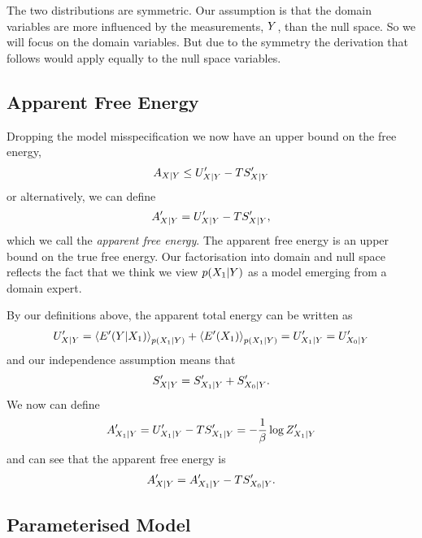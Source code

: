 \documentclass[]{article}
\begin{document}
The two distributions are symmetric. Our assumption is that the domain
variables are more influenced by the measurements, \(Y\),
than the null space. So we will focus on the domain variables. But due
to the symmetry the derivation that follows would apply equally to the
null space variables.

\subsection{Apparent Free Energy}

Dropping the model misspecification we now have an upper bound on the
free energy, 
\[
A_{X|Y} \leq U^\prime_{X|Y} - TS^\prime_{X|Y} 
\] 
or alternatively, we can define 
\[
A^\prime_{X|Y} = U^\prime_{X|Y} - TS^\prime_{X|Y},
\] 
which we call the \emph{apparent free energy}. The apparent free
energy is an upper bound on the true free energy. Our factorisation into
domain and null space reflects the fact that we think we view
\(p(X_1 | Y)\) as a model emerging
from a domain expert.

By our definitions above, the apparent total energy can be written as 
\[
U^\prime_{X|Y} = \left\langle E^\prime(Y |X_1) \right\rangle_{p(X_1| Y)} + \left\langle E^\prime(X_1) \right\rangle_{p(X_1| Y)} = U^\prime_{X_1|Y} = U^\prime_{X_0|Y}
\] 
and our independence assumption means that 
\[
S^\prime_{X|Y} = S^\prime_{X_1|Y} + S^\prime_{X_0|Y}.
\] 
We now can define 
\[
A^\prime_{X_1|Y} = U^\prime_{X_1|Y} - TS^\prime_{X_1|Y} = -\frac{1}{\beta} \log Z^\prime_{X_1|Y}
\] 
and can see that the apparent free energy is 
\[
A^\prime_{X|Y} = A^\prime_{X_1|Y} - TS^\prime_{X_0|Y}.
\]

\subsection{Parameterised Model}
\end{document}
